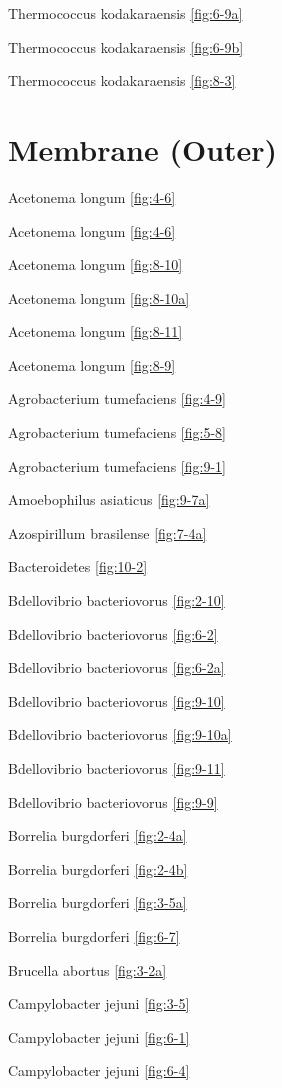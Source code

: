 \documentclass[]{tufte-book}
\begin{document}
Thermococcus kodakaraensis \ref{fig:6-9a}

Thermococcus kodakaraensis \ref{fig:6-9b}

Thermococcus kodakaraensis \ref{fig:8-3}

\section*{Membrane (Outer)}\label{membrane-outer}

Acetonema longum \ref{fig:4-6}

Acetonema longum \ref{fig:4-6}

Acetonema longum \ref{fig:8-10}

Acetonema longum \ref{fig:8-10a}

Acetonema longum \ref{fig:8-11}

Acetonema longum \ref{fig:8-9}

Agrobacterium tumefaciens \ref{fig:4-9}

Agrobacterium tumefaciens \ref{fig:5-8}

Agrobacterium tumefaciens \ref{fig:9-1}

Amoebophilus asiaticus \ref{fig:9-7a}

Azospirillum brasilense \ref{fig:7-4a}

Bacteroidetes \ref{fig:10-2}

Bdellovibrio bacteriovorus \ref{fig:2-10}

Bdellovibrio bacteriovorus \ref{fig:6-2}

Bdellovibrio bacteriovorus \ref{fig:6-2a}

Bdellovibrio bacteriovorus \ref{fig:9-10}

Bdellovibrio bacteriovorus \ref{fig:9-10a}

Bdellovibrio bacteriovorus \ref{fig:9-11}

Bdellovibrio bacteriovorus \ref{fig:9-9}

Borrelia burgdorferi \ref{fig:2-4a}

Borrelia burgdorferi \ref{fig:2-4b}

Borrelia burgdorferi \ref{fig:3-5a}

Borrelia burgdorferi \ref{fig:6-7}

Brucella abortus \ref{fig:3-2a}

Campylobacter jejuni \ref{fig:3-5}

Campylobacter jejuni \ref{fig:6-1}

Campylobacter jejuni \ref{fig:6-4}
\end{document}
